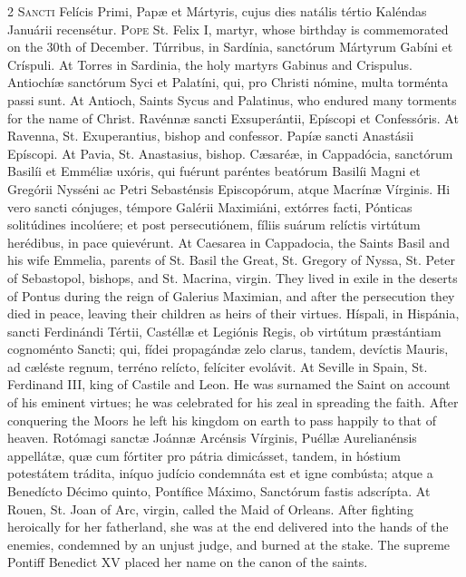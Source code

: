 \begin{paracol}{2}
\lettrine[lines=2]{S}{ancti} Felícis Primi, 
 Papæ et Mártyris, cujus dies natális tértio Kaléndas Januárii recensétur.
\switchcolumn
{}
\lettrine[lines=2]{P}{ope} St. Felix I, martyr, whose 
 birthday is commemorated on the 30th of December.
\switchcolumn*
{}
Túrribus, in Sardínia, sanctórum Mártyrum Gabíni et Críspuli.
\switchcolumn
{}
At Torres in Sardinia, the holy 
 martyrs Gabinus and Crispulus.
\switchcolumn*
{}
Antiochíæ sanctórum 
 Syci et Palatíni, qui, pro Christi nómine, multa torménta passi sunt.
\switchcolumn
{}
At Antioch, Saints Sycus and 
 Palatinus, who endured many torments for the name of Christ.
\switchcolumn*
{}
Ravénnæ sancti 
 Exsuperántii, Epíscopi et Confessóris.
\switchcolumn
{}
At Ravenna, St. Exuperantius, 
 bishop and confessor.
\switchcolumn*
{}
Papíæ sancti Anastásii 
 Epíscopi.
\switchcolumn
{}
At Pavia, St. Anastasius, bishop.
\switchcolumn*
{}
Cæsaréæ, in Cappadócia, 
 sanctórum Basilíi et Emméliæ uxóris, qui fuérunt paréntes beatórum Basilíi 
 Magni et Gregórii Nysséni ac Petri Sebasténsis Episcopórum, atque Macrínæ 
 Vírginis. Hi vero sancti cónjuges, témpore Galérii Maximiáni, extórres 
 facti, Pónticas solitúdines incolúere; et post persecutiónem, fíliis suárum 
 relíctis virtútum herédibus, in pace quievérunt.
\switchcolumn
{}
At Caesarea in Cappadocia, the 
 Saints Basil and his wife Emmelia, parents of St. Basil the Great, St. 
 Gregory of Nyssa, St. Peter of Sebastopol, bishops, and St. Macrina, virgin. 
 They lived in exile in the deserts of Pontus during the reign of Galerius 
 Maximian, and after the persecution they died in peace, leaving their 
 children as heirs of their virtues.
\switchcolumn*
{}
Híspali, in Hispánia, 
 sancti Ferdinándi Tértii, Castéllæ et Legiónis Regis, ob virtútum 
 præstántiam cognoménto Sancti; qui, fídei propagándæ zelo clarus, tandem, 
 devíctis Mauris, ad cæléste regnum, terréno relícto, felíciter evolávit.
\switchcolumn
{}
At Seville in Spain, St. Ferdinand 
 III, king of Castile and Leon. He was surnamed the Saint on account of 
 his eminent virtues; he was celebrated for his zeal in spreading the faith. 
 After conquering the Moors he left his kingdom on earth to pass happily to 
 that of heaven.
\switchcolumn*
{}
Rotómagi sanctæ Joánnæ 
 Arcénsis Vírginis, Puéllæ Aurelianénsis appellátæ, quæ cum fórtiter pro 
 pátria dimicásset, tandem, in hóstium potestátem trádita, iníquo judício 
 condemnáta est et igne combústa; atque a Benedícto Décimo quinto, Pontífice 
 Máximo, Sanctórum fastis adscrípta.
\switchcolumn
{}
At Rouen, St. Joan of Arc, virgin, 
 called the Maid of Orleans. After fighting heroically for her 
 fatherland, she was at the end delivered into the hands of the enemies, 
 condemned by an unjust judge, and burned at the stake. The supreme 
 Pontiff Benedict XV placed her name on the canon of the saints.
\switchcolumn*
{}
\end{paracol}


